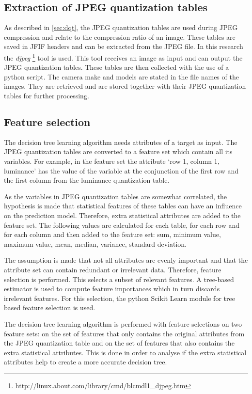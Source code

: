 \subsection{Extraction of JPEG quantization tables}
As described in \autoref{sec:dqt}, the JPEG quantization tables are used during JPEG compression and relate to the compression ratio of an image. These tables are saved in JFIF headers and can be extracted from the JPEG file. In this research the \textit{djpeg} \footnote{http://linux.about.com/library/cmd/blcmdl1\_djpeg.htm} tool is used. This tool receives an image as input and can output the JPEG quantization tables. These tables are then collected with the use of a python script. The camera make and models are stated in the file names of the images. They are retrieved and are stored together with their JPEG quantization tables for further processing.

\subsection{Feature selection}\label{sec:featselect}
The decision tree learning algorithm needs attributes of a target as input. The JPEG quantization tables are converted to a feature set which contain all its variables. For example, in the feature set the attribute `row 1, column 1, luminance' has the value of the variable at the conjunction of the first row and the first column from the luminance quantization table. 

As the variables in JPEG quantization tables are somewhat correlated, the hypothesis is made that statistical features of these tables can have an influence on the prediction model. Therefore, extra statistical attributes are added to the feature set. The following values are calculated for each table, for each row and for each column and then added to the feature set: sum, minimum value, maximum value, mean, median, variance, standard deviation.

The assumption is made that not all attributes are evenly important and that the attribute set can contain redundant or irrelevant data. Therefore, feature selection is performed. This selects a subset of relevant features. A tree-based estimator is used to compute feature importances which in turn discards irrelevant features. For this selection, the python Scikit Learn \cite{scikit-learn} module for tree based feature selection is used.

The decision tree learning algorithm is performed with feature selections on two feature sets: on the set of features that only contains the original attributes from the JPEG quantization table and on the set of features that also contains the extra statistical attributes. This is done in order to analyse if the extra statistical attributes help to create a more accurate decision tree.

